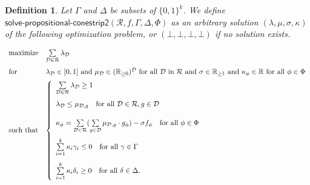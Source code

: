 \documentclass{article}
\theoremstyle{mytheorem}
\newtheorem{definition}[theorem]{Definition}
\newcommand{\func}[1]{\ensuremath{\textsf{#1}}} %
\newcommand{\set}[1]{\ensuremath{\{ #1 \} }} %
\begin{document}
\begin{definition}
Let $\Gamma$ and $\Delta$ be subsets of $\set{0,1}^k$. We define $\func{solve-propositional-conestrip2}(\mathcal{R}, f, \Gamma, \Delta, \Phi)$ as an arbitrary solution $(\lambda, \mu, \sigma, \kappa)$ of the following optimization problem, or $(\bot,\bot,\bot,\bot)$ if no solution exists.

\begin{equation} \label{eq:propositional_conestrip2}
\begin{array}{ll}
    \text{maximize} & \sum\limits_{\mathcal{D} \in \mathcal{R}} \lambda_\mathcal{D}
    \\ [0.5cm]

    \text{for} & \lambda_\mathcal{D} \in [0,1] \text{ and } \mu_\mathcal{D} \in (\mathbb{R}_{\geq 0})^\mathcal{D} \text{ for all } \mathcal{D} \text{ in } \mathcal{R} \text{ and } \sigma \in \mathbb{R}_{\geq 1} \text{ and } \kappa_\phi \in \mathbb{R} \text{ for all } \phi \in \Phi
    \\ [\medskipamount]

    \text{such that} & 
    \left\{
    \begin{array}{ll}
         \sum\limits_{\mathcal{D} \in \mathcal{R}} \lambda_\mathcal{D} \geq 1 \\ [0.5cm]

         \lambda_\mathcal{D} \leq \mu_{\mathcal{D},g}
         \quad \text{for all } \mathcal{D} \in \mathcal{R}, g \in \mathcal{D} \\ [0.5cm] 

         \kappa_\phi =
         \sum\limits_{\mathcal{D} \in \mathcal{R}}
         (
         \sum\limits_{g \in \mathcal{D}} \mu_{\mathcal{D},g} \cdot g_\phi
         )
         - \sigma f_\phi \quad \text{for all } \phi \in \Phi \\ [0.5cm]
         
         \sum\limits_{i = 1}^k
         \kappa_i \gamma_i \leq 0
         \quad \text{for all } \gamma \in \Gamma \\ [0.5cm] 
         
         \sum\limits_{i = 1}^k
         \kappa_i \delta_i \geq 0
         \quad \text{for all } \delta \in \Delta.
    \end{array}
    \right.
\end{array}
\end{equation}

\end{definition}
\end{document}
